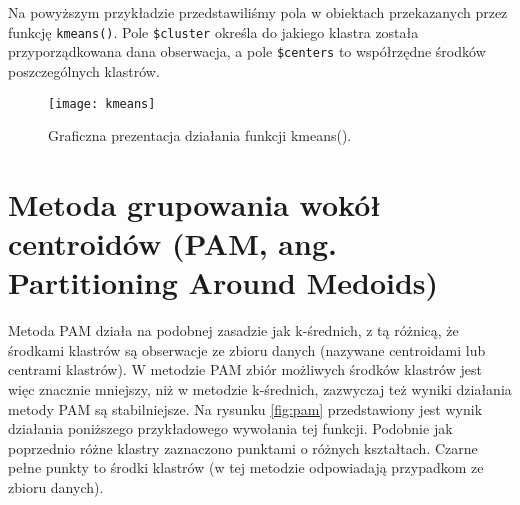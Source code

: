 \documentclass[polish,]{book}
\begin{document}
Na powyższym przykładzie przedstawiliśmy pola w obiektach przekazanych przez
funkcję \texttt{kmeans()}. Pole \texttt{\$cluster} określa do jakiego klastra została przyporządkowana dana obserwacja, a pole \texttt{\$centers} to współrzędne środków poszczególnych klastrów.

\begin{figure}

{\centering \texttt{[image: kmeans]} 

}

\caption{Graficzna prezentacja działania funkcji kmeans().}\label{fig:kmeans}
\end{figure}

\hypertarget{part_32}{%
\section{Metoda grupowania wokół centroidów (PAM, ang. Partitioning Around Medoids)}\label{part_32}}

Metoda PAM działa na podobnej zasadzie jak k-średnich, z tą różnicą, że środkami klastrów są obserwacje ze zbioru danych (nazywane centroidami lub centrami
klastrów). W metodzie PAM zbiór możliwych środków klastrów jest więc znacznie
mniejszy, niż w metodzie k-średnich, zazwyczaj też wyniki działania metody PAM
są stabilniejsze. Na rysunku \ref{fig:pam} przedstawiony jest wynik działania poniższego przykładowego wywołania tej funkcji. Podobnie jak poprzednio różne klastry zaznaczono
punktami o różnych kształtach. Czarne pełne punkty to środki klastrów (w tej metodzie odpowiadają przypadkom ze zbioru danych).
\end{document}
